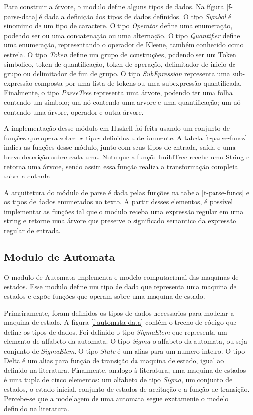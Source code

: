 Para construir a árvore, o modulo define alguns tipos de dados.
Na fígura \ref{f-parse-data} é dada a definição dos tipos de dados definidos.
O típo \emph{Symbol} é sinomimo de um tipo de caractere.
O tipo \emph{Operator} define uma enumeração, podendo ser ou uma concatenação ou uma alternação.
O tipo \emph{Quantifier} define uma enumeração, representando o operador de Kleene, também conhecido como estrela.
O tipo \emph{Token} define um grupo de construções, podendo ser um Token simbolico, token de quantificação, token de operação, delimitador de inicio de grupo ou delimitador de fim de grupo.
O tipo \emph{SubEpression} representa uma sub-expressão composta por uma lista de tokens ou uma subexpressão quantificada.
Finalmente, o tipo \emph{ParseTree} representa uma árvore, podendo ter uma folha contendo um símbolo; um nó contendo uma arvore e uma quantificação; um nó contendo uma árvore, operador e outra árvore.


A implementação desse módulo em Haskell foi feita usando um conjunto de funções que opera sobre os tipos definidos anteriormente.
A tabela \ref{t-parse-funcs} indica as funções desse módulo, junto com seus tipos de entrada, saída e uma breve descrição sobre cada uma.
Note que a função buildTree recebe uma String e retorna uma árvore, sendo assim essa função realiza a transformação completa sobre a entrada.



A arquitetura do módulo de parse é dada pelas funções na tabela \ref{t-parse-funcs} e os tipos de dados enumerados no texto.
A partir desses elementos, é possível implementar as funções tal que o modulo receba uma expressão regular em uma string e retorne uma árvore que preserve o significado semantico da expressão regular de entrada.

\subsection{Modulo de Automata}

O modulo de Automata implementa o modelo computacional das maquinas de estados.
Esse modulo define um tipo de dado que representa uma maquina de estados e expõe funções que operam sobre uma maquina de estado.

Primeiramente, foram definidos os tipos de dados necessarios para modelar a maquina de estado.
A fígura \ref{f-automata-data} contém o trecho de código que define os tipos de dados.
Foi definido o tipo \emph{SigmaElem} que representa um elemento do alfabeto da automata.
O tipo \emph{Sigma} o alfabeto da automata, ou seja conjunto de \emph{SigmaElem}.
O tipo \emph{State} é um alias para um numero inteiro.
O tipo Delta é um alias para função de transição da maquina de estado, igual ao definido na literatura.
Finalmente, analogo à literatura, uma maquina de estados é uma tupla de cinco elementos: um alfabeto de tipo \emph{Sigma}, um conjunto de estados, o estado inicial, conjunto de estados de aceitação e a função de transição.
Percebe-se que a modelagem de uma automata segue exatamente o modelo definido na literatura.

